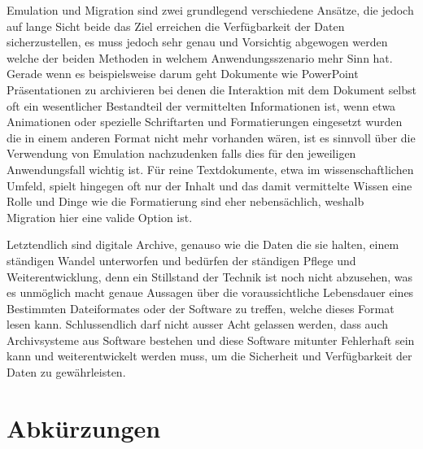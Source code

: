 \documentclass[conference,compsoc,final,a4paper]{IEEEtran}
\begin{document}
Emulation und Migration sind zwei grundlegend verschiedene Ansätze, die jedoch auf lange Sicht beide das Ziel erreichen die Verfügbarkeit der Daten sicherzustellen, es muss jedoch sehr genau und Vorsichtig abgewogen werden welche der beiden Methoden in welchem Anwendungsszenario mehr Sinn hat. Gerade wenn es beispielsweise darum geht Dokumente wie PowerPoint Präsentationen zu archivieren bei denen die Interaktion mit dem Dokument selbst oft ein wesentlicher Bestandteil der vermittelten Informationen ist, wenn etwa Animationen oder spezielle Schriftarten und Formatierungen eingesetzt wurden die in einem anderen Format nicht mehr vorhanden wären, ist es sinnvoll über die Verwendung von Emulation nachzudenken falls dies für den jeweiligen Anwendungsfall wichtig ist. Für reine Textdokumente, etwa im wissenschaftlichen Umfeld, spielt hingegen oft nur der Inhalt und das damit vermittelte Wissen eine Rolle und Dinge wie die Formatierung sind eher nebensächlich, weshalb Migration hier eine valide Option ist.

Letztendlich sind digitale Archive, genauso wie die Daten die sie halten, einem ständigen Wandel unterworfen und bedürfen der ständigen Pflege und Weiterentwicklung, denn ein Stillstand der Technik ist noch nicht abzusehen, was es unmöglich macht genaue Aussagen über die voraussichtliche Lebensdauer eines Bestimmten Dateiformates oder der Software zu treffen, welche dieses Format lesen kann. Schlussendlich darf nicht ausser Acht gelassen werden, dass auch Archivsysteme aus Software bestehen und diese Software mitunter Fehlerhaft sein kann und weiterentwickelt werden muss, um die Sicherheit und Verfügbarkeit der Daten zu gewährleisten.

\section*{Abkürzungen}

\begin{acronym}[D-SDA]
\end{acronym}

\nocite{*} %
\printbibliography
\end{document}

